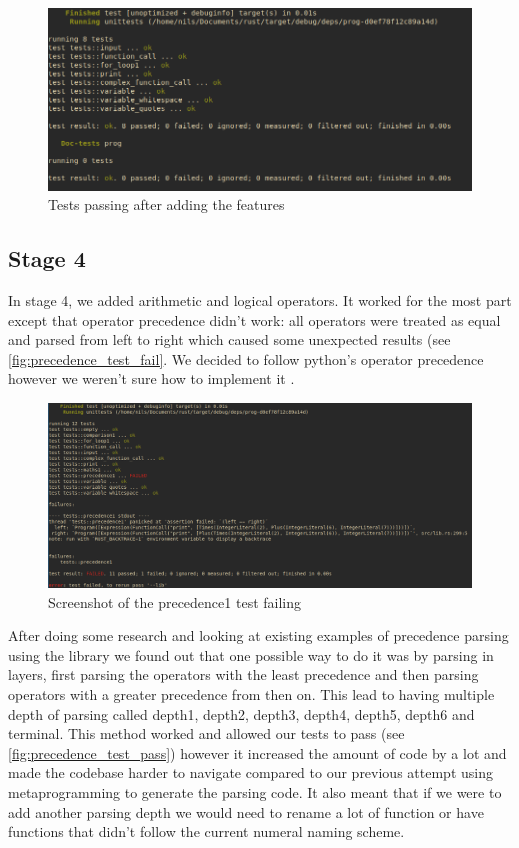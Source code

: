 \documentclass{article}
\begin{document}
\begin{figure}
	\includegraphics[width=\textwidth]{stage3_test}
	\caption{Tests passing after adding the features}
	\label{fig:stage3_test}
\end{figure}

\subsection{Stage 4}

In stage 4, we added arithmetic and logical operators. It worked for the most
part except that operator precedence didn't work: all operators were treated as
equal and parsed from left to right which caused some unexpected results (see
\autoref{fig:precedence_test_fail}. We decided to follow python's operator
precedence however we weren't sure how to implement it
\cite{python_precedence}.

\begin{figure}
	\includegraphics[width=\textwidth]{precedence_test_fail}
	\caption{Screenshot of the precedence1 test failing}
	\label{fig:precedence_test_fail}
\end{figure}

After doing some research and looking at existing examples of precedence
parsing using the  library we found out that one possible way to
do it was by parsing in layers, first parsing the operators with the least
precedence and then parsing operators with a greater precedence from then on.
This lead to having multiple depth of parsing called depth1, depth2, depth3,
depth4, depth5, depth6 and terminal. This method worked and allowed our tests
to pass (see \autoref{fig:precedence_test_pass}) however it increased the
amount of code by a lot and made the codebase harder to navigate compared to
our previous attempt using metaprogramming to generate the parsing code. It
also meant that if we were to add another parsing depth we would need to rename
a lot of function or have functions that didn't follow the current numeral
naming scheme.
\end{document}

